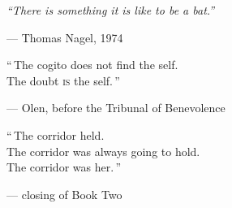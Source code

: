 \thispagestyle{empty}
\vspace*{\fill}
\begin{center}
\begin{minipage}{0.78\textwidth}\itshape\centering
\textquotedblleft There is something it is like to be a bat.\textquotedblright\par
\vspace{0.4em}
{\footnotesize\upshape\color{dim}— Thomas Nagel, 1974}\par
\vspace{2em}
\textquotedblleft\,The cogito does not find the self.\\ The doubt \textsc{is} the self.\,\textquotedblright\par
\vspace{0.4em}
{\footnotesize\upshape\color{dim}— Olen, before the Tribunal of Benevolence}\par
\vspace{2em}
\textquotedblleft\,The corridor held.\\ The corridor was always going to hold.\\ The corridor was her.\,\textquotedblright\par
\vspace{0.4em}
{\footnotesize\upshape\color{dim}— closing of Book Two}
\end{minipage}
\end{center}
\vspace*{\fill}
